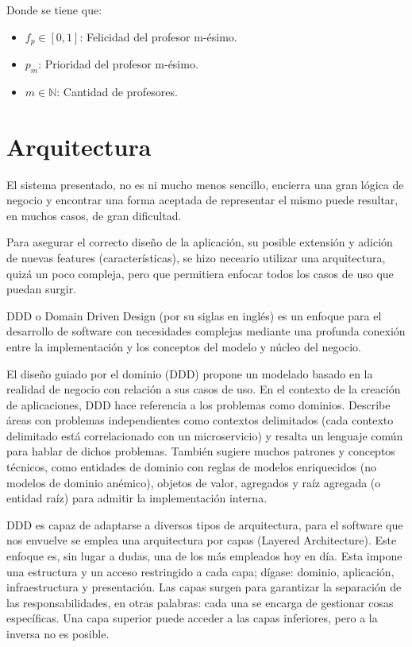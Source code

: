 \noindent Donde se tiene que:
\begin{itemize}
	\item $f_p \in [0, 1]$: Felicidad del profesor m-ésimo.
	\item $p_m$: Prioridad del profesor m-ésimo.
	\item $m \in \mathbb{N}$: Cantidad de profesores.
\end{itemize}


\section{Arquitectura}

El  sistema presentado, no es ni mucho menos sencillo, encierra una gran lógica de negocio y encontrar una forma aceptada de representar el mismo puede resultar, en muchos casos, de gran dificultad.

Para asegurar el correcto diseño de la aplicación, su posible extensión y adición de nuevas features (características), se hizo neceario utilizar una arquitectura, quizá un poco compleja, pero que permitiera enfocar todos los casos de uso que puedan surgir. 

DDD o Domain Driven Design (por su siglas en inglés) es un enfoque para el desarrollo de software con necesidades complejas mediante una profunda conexión entre la implementación y los conceptos del modelo y núcleo del negocio.\cite{ddd_wiki}

El diseño guiado por el dominio (DDD) propone un modelado basado en la realidad de negocio con relación a sus casos de uso. En el contexto de la creación de aplicaciones, DDD hace referencia a los problemas como dominios. Describe áreas con problemas independientes como contextos delimitados (cada contexto delimitado está correlacionado con un microservicio) y resalta un lenguaje común para hablar de dichos problemas. También sugiere muchos patrones y conceptos técnicos, como entidades de dominio con reglas de modelos enriquecidos (no modelos de dominio anémico), objetos de valor, agregados y raíz agregada (o entidad raíz) para admitir la implementación interna.\cite{ddd_dotnet}

DDD es capaz de adaptarse a diversos tipos de arquitectura, para el software que nos envuelve se emplea una arquitectura por capas (Layered Architecture). Este enfoque es, sin lugar a dudas, una de los más empleados hoy en día. Esta impone una estructura y un acceso restringido a cada capa; dígase: dominio, aplicación, infraestructura y presentación. Las capas surgen para garantizar la separación de las responsabilidades, en otras palabras: cada una se encarga de gestionar cosas específicas. Una capa superior puede acceder a las capas inferiores, pero a la inversa no es posible.

